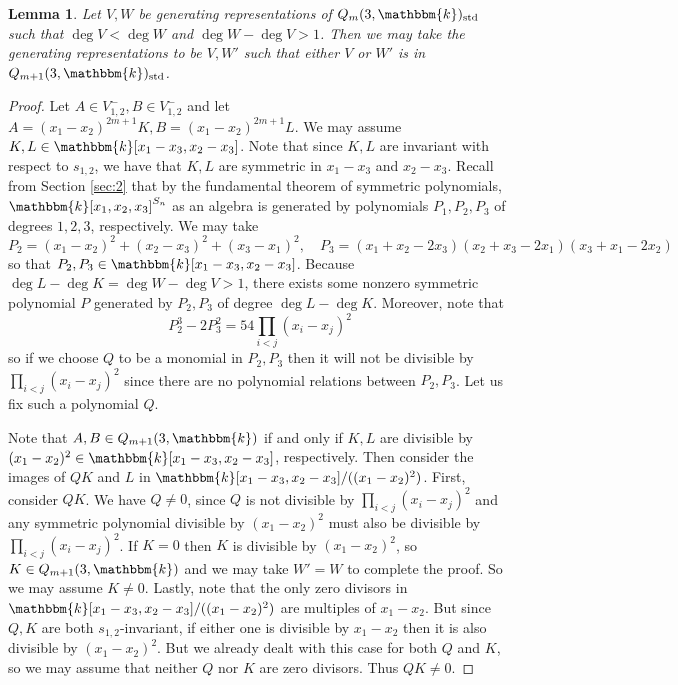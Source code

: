 \documentclass[11pt]{article}
\newtheorem{lemma}[theorem]{Lemma}
\theoremstyle{definition}
\renewcommand{\k}{\mathbbm{k}}
\newcommand{\std}{\mathrm{std}}
\begin{document}
\begin{lemma}\label{lem:3.6}
    Let $V,W$ be generating representations of $Q_m(3,\k)_\std$ such that $\deg V<\deg W$ and $\deg W-\deg V>1$. Then we may take the generating representations to be $V,W'$ such that either $V$ or $W'$ is in $Q_{m+1}(3,\k)_\std$.
\end{lemma}
\begin{proof}
    Let $A\in V_{1,2}^-,B\in V_{1,2}^-$ and let $A=(x_1-x_2)^{2m+1}K,B=(x_1-x_2)^{2m+1}L$. We may assume $K,L\in\k[x_1-x_3,x_2-x_3]$. Note that since $K,L$ are invariant with respect to $s_{1,2}$, we have that $K,L$ are symmetric in $x_1-x_3$ and $x_2-x_3$. Recall from Section \ref{sec:2} that by the fundamental theorem of symmetric polynomials, $\k[x_1,x_2,x_3]^{S_n}$ as an algebra is generated by polynomials $P_1,P_2,P_3$ of degrees $1,2,3$, respectively. We may take 
    $$P_2=(x_1-x_2)^2+(x_2-x_3)^2+(x_3-x_1)^2,\quad P_3=(x_1+x_2-2x_3)(x_2+x_3-2x_1)(x_3+x_1-2x_2)$$
    so that $P_2,P_3\in\k[x_1-x_3,x_2-x_3]$. Because $\deg L-\deg K=\deg W-\deg V>1$, there exists some nonzero symmetric polynomial $P$ generated by $P_2,P_3$ of degree $\deg L-\deg K$. Moreover, note that 
    $$P_2^3-2P_3^2=54\prod_{i<j}(x_i-x_j)^2$$
    so if we choose $Q$ to be a monomial in $P_2,P_3$ then it will not be divisible by $\prod_{i<j}(x_i-x_j)^2$ since there are no polynomial relations between $P_2,P_3$. 
    Let us fix such a polynomial $Q$.
    
    Note that $A,B\in Q_{m+1}(3,\k)$ if and only if $K,L$ are divisible by $(x_1-x_2)^2\in \k[x_1-x_3,x_2-x_3]$, respectively. Then consider the images of $QK$ and $L$ in $\k[x_1-x_3,x_2-x_3]/((x_1-x_2)^2)$. First, consider $QK$. We have $Q\neq 0$, since $Q$ is not divisible by $\prod_{i<j}(x_i-x_j)^2$ and any symmetric polynomial divisible by $(x_1-x_2)^2$ must also be divisible by $\prod_{i<j}(x_i-x_j)^2$. If $K=0$ then $K$ is divisible by $(x_1-x_2)^2$, so $K\in Q_{m+1}(3,\k)$ and we may take $W'=W$ to complete the proof. So we may assume $K\neq 0$. Lastly, note that the only zero divisors in $\k[x_1-x_3,x_2-x_3]/((x_1-x_2)^2)$ are multiples of $x_1-x_2$. But since $Q,K$ are both $s_{1,2}$-invariant, if either one is divisible by $x_1-x_2$ then it is also divisible by $(x_1-x_2)^2$. But we already dealt with this case for both $Q$ and $K$, so we may assume that neither $Q$ nor $K$ are zero divisors. Thus $QK\neq 0$. 
    

\end{proof}
\end{document}
